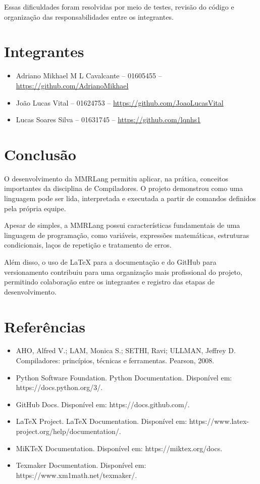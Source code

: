 \documentclass[12pt,a4paper]{article}
\begin{document}
Essas dificuldades foram resolvidas por meio de testes, revisão do código e organização das responsabilidades entre os integrantes.

\section{Integrantes}

\begin{itemize}
\item Adriano Mikhael M L Cavalcante -- 01605455 -- \url{https://github.com/AdrianoMikhael}
\item João Lucas Vital -- 01624753 -- \url{https://github.com/JoaoLucasVital}
\item Lucas Soares Silva -- 01631745 -- \url{https://github.com/lqnhs1}
\end{itemize}

\section{Conclusão}

O desenvolvimento da MMRLang permitiu aplicar, na prática, conceitos importantes da disciplina de Compiladores. O projeto demonstrou como uma linguagem pode ser lida, interpretada e executada a partir de comandos definidos pela própria equipe.

Apesar de simples, a MMRLang possui características fundamentais de uma linguagem de programação, como variáveis, expressões matemáticas, estruturas condicionais, laços de repetição e tratamento de erros.

Além disso, o uso de LaTeX para a documentação e do GitHub para versionamento contribuiu para uma organização mais profissional do projeto, permitindo colaboração entre os integrantes e registro das etapas de desenvolvimento.

\section{Referências}

\begin{itemize}
\item AHO, Alfred V.; LAM, Monica S.; SETHI, Ravi; ULLMAN, Jeffrey D. Compiladores: princípios, técnicas e ferramentas. Pearson, 2008.
\item Python Software Foundation. Python Documentation. Disponível em: https://docs.python.org/3/.
\item GitHub Docs. Disponível em: https://docs.github.com/.
\item LaTeX Project. LaTeX Documentation. Disponível em: https://www.latex-project.org/help/documentation/.
\item MiKTeX Documentation. Disponível em: https://miktex.org/docs.
\item Texmaker Documentation. Disponível em: https://www.xm1math.net/texmaker/.
\end{itemize}
\end{document}
